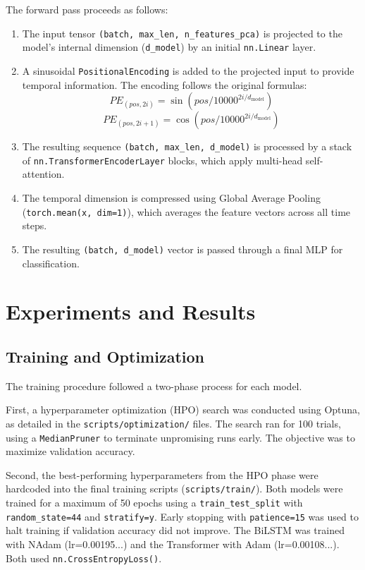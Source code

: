 \documentclass[]{IEEEphot}
\begin{document}
The forward pass proceeds as follows:
\begin{enumerate}
    \item The input tensor \texttt{(batch, max\_len, n\_features\_pca)} is projected to the model's internal dimension (\texttt{d\_model}) by an initial \texttt{nn.Linear} layer.
    \item A sinusoidal \texttt{PositionalEncoding} is added to the projected input to provide temporal information. The encoding follows the original formulas:
    \begin{equation}
    PE_{(pos, 2i)} = \sin(pos / 10000^{2i / d_{\text{model}}})
    \end{equation}
    \begin{equation}
    PE_{(pos, 2i+1)} = \cos(pos / 10000^{2i / d_{\text{model}}})
    \end{equation}
    \item The resulting sequence \texttt{(batch, max\_len, d\_model)} is processed by a stack of \texttt{nn.TransformerEncoderLayer} blocks, which apply multi-head self-attention.
    \item The temporal dimension is compressed using Global Average Pooling (\texttt{torch.mean(x, dim=1)}), which averages the feature vectors across all time steps.
    \item The resulting \texttt{(batch, d\_model)} vector is passed through a final MLP for classification.
\end{enumerate}


\section{Experiments and Results}

\subsection{Training and Optimization}
The training procedure followed a two-phase process for each model.

First, a hyperparameter optimization (HPO) search was conducted using Optuna, as detailed in the \texttt{scripts/optimization/} files. The search ran for 100 trials, using a \texttt{MedianPruner} to terminate unpromising runs early. The objective was to maximize validation accuracy.

Second, the best-performing hyperparameters from the HPO phase were hardcoded into the final training scripts (\texttt{scripts/train/}). Both models were trained for a maximum of 50 epochs using a \texttt{train\_test\_split} with \texttt{random\_state=44} and \texttt{stratify=y}. Early stopping with \texttt{patience=15} was used to halt training if validation accuracy did not improve. The BiLSTM was trained with NAdam (lr=0.00195...) and the Transformer with Adam (lr=0.00108...). Both used \texttt{nn.CrossEntropyLoss()}.
\end{document}
